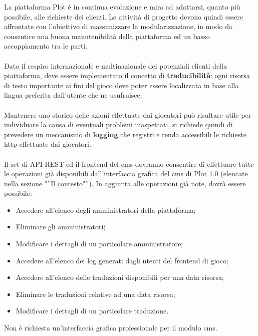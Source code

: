 La piattaforma Plot è in continua evoluzione e mira ad adattarsi, quanto più possibile, alle richieste dei clienti. Le attività di progetto devono quindi essere affrontate con l'obiettivo di massimizzare la modularizzazione, in modo da consentire una buona manutenibilità della piattaforma ed un basso accoppiamento tra le parti.
\\ \\
Dato il respiro internazionale e multinazionale dei potenziali clienti della piattaforma, deve essere implementato il concetto di \textbf{traducibilità}: ogni risorsa di testo importante ai fini del gioco deve poter essere localizzata in base alla lingua preferita dall'utente che ne usufruisce.
\\ \\
Mantenere uno storico delle azioni effettuate dai giocatori può risultare utile per individuare la causa di eventuali problemi inaspettati, si richiede quindi di prevedere un meccanismo di \textbf{logging} che registri e renda accessibili le richieste \gls{http}\glsfirstoccur{} effettuate dai giocatori.
\\ \\
Il set di API REST ed il \gls{frontend}\glsfirstoccur{} del \gls{cms}\glsfirstoccur{} dovranno consentire di effettuare tutte le operazioni già disponibili dall'interfaccia grafica del \gls{cms}\glsfirstoccur{} di Plot 1.0 (elencate nella sezione "`\hyperref[sec:hello]{Il contesto}"`). 
In aggiunta alle operazioni già note, dovrà essere possibile:
\begin{itemize}
	\item Accedere all'elenco degli amministratori della piattaforma;
	\item Eliminare gli amministratori;
	\item Modificare i dettagli di un particolare amministratore;
	\item Accedere all'elenco dei log generati dagli utenti del \gls{frontend}\glsfirstoccur{} di gioco;
	\item Accedere all'elenco delle traduzioni disponibili per una data risorsa;
	\item Eliminare le traduzioni relative ad una data risorsa;
	\item Modificare i dettagli di un particolare traduzione.
\end{itemize}

Non è richiesta un'interfaccia grafica professionale per il modulo \gls{cms}\glsfirstoccur{}.

